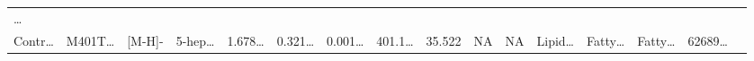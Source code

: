 \documentclass[
]{article}
\begin{document}
\begin{longtable}[]{@{}llllllllllllllll@{}}
\begin{minipage}[t]{0.02\columnwidth}
\ldots{}\strut
\end{minipage}\tabularnewline
\begin{minipage}[t]{0.04\columnwidth}\raggedright
Contr\ldots{}\strut
\end{minipage} & \begin{minipage}[t]{0.04\columnwidth}\raggedright
M401T\ldots{}\strut
\end{minipage} & \begin{minipage}[t]{0.04\columnwidth}\raggedright
{[}M-H{]}-\strut
\end{minipage} & \begin{minipage}[t]{0.04\columnwidth}\raggedright
5-hep\ldots{}\strut
\end{minipage} & \begin{minipage}[t]{0.04\columnwidth}\raggedright
1.678\ldots{}\strut
\end{minipage} & \begin{minipage}[t]{0.04\columnwidth}\raggedright
0.321\ldots{}\strut
\end{minipage} & \begin{minipage}[t]{0.04\columnwidth}\raggedright
0.001\ldots{}\strut
\end{minipage} & \begin{minipage}[t]{0.04\columnwidth}\raggedright
401.1\ldots{}\strut
\end{minipage} & \begin{minipage}[t]{0.04\columnwidth}\raggedright
35.522\strut
\end{minipage} & \begin{minipage}[t]{0.04\columnwidth}\raggedright
NA\strut
\end{minipage} & \begin{minipage}[t]{0.03\columnwidth}\raggedright
NA\strut
\end{minipage} & \begin{minipage}[t]{0.04\columnwidth}\raggedright
Lipid\ldots{}\strut
\end{minipage} & \begin{minipage}[t]{0.04\columnwidth}\raggedright
Fatty\ldots{}\strut
\end{minipage} & \begin{minipage}[t]{0.04\columnwidth}\raggedright
Fatty\ldots{}\strut
\end{minipage} & \begin{minipage}[t]{0.04\columnwidth}\raggedright
62689\ldots{}\strut
\end{minipage} & \begin{minipage}[t]{0.02\columnwidth}\raggedright

\end{minipage}
\end{longtable}
\end{document}
